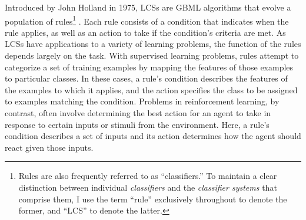 \documentclass[11pt]{article}
\begin{document}
Introduced by John Holland in 1975, LCSs are GBML algorithms that evolve a population of rules\footnote{Rules are also frequently referred to as ``classifiers.'' To maintain a clear distinction between individual \emph{classifiers} and the \emph{classifier systems} that comprise them, I use the term ``rule'' exclusively throughout to denote the former, and ``LCS'' to denote the latter.} \cite{holland_adaptation_1975}. Each rule consists of a condition that indicates when the rule applies, as well as an action to take if the condition's criteria are met. As LCSs have applications to a variety of learning problems, the function of the rules depends largely on the task. With supervised learning problems, rules attempt to categorize a set of training examples by mapping the features of those examples to particular classes. In these cases, a rule's condition describes the features of the examples to which it applies, and the action specifies the class to be assigned to examples matching the condition. Problems in reinforcement learning, by contrast, often involve determining the best action for an agent to take in response to certain inputs or stimuli from the environment. Here, a rule's condition describes a set of inputs and its action determines how the agent should react given those inputs.
\end{document}
